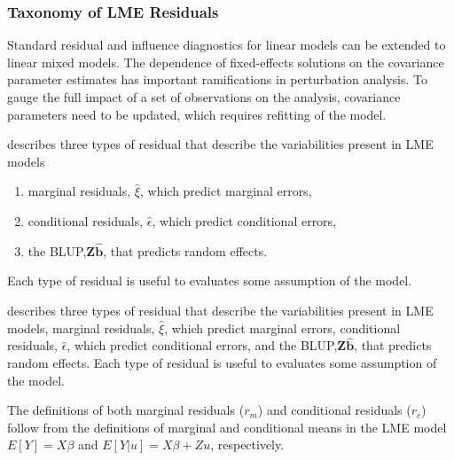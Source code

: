 \documentclass[]{report}
\begin{document}
%

	\subsubsection{Taxonomy of LME Residuals}
	Standard residual and influence diagnostics for linear models can
	be extended to linear mixed models. The dependence of
	fixed-effects solutions on the covariance parameter estimates has
	important ramifications in perturbation analysis. To gauge the
	full impact of a set of observations on the analysis, covariance
	parameters need to be updated, which requires refitting of the
	model.

\citet{PB} describes three types of residual that describe the variabilities
present in LME models
\begin{enumerate}
	\item marginal residuals, $\hat{\xi}$, which predict marginal errors,
	\item conditional residuals, $\hat{\epsilon}$, which predict conditional errors,
	\item the BLUP,$\boldsymbol{Z\hat{b}}$, that predicts random effects.
\end{enumerate}
Each type of residual is useful to evaluates some assumption of the model.
	
\citet{PB} describes three types of residual that describe the variabilities
present in LME models, marginal residuals, $\hat{\xi}$, which predict marginal errors, conditional residuals, $\hat{\epsilon}$, which predict conditional errors, and the BLUP,$\boldsymbol{Z\hat{b}}$, that predicts random effects.
Each type of residual is useful to evaluates some assumption of the model.
	
The definitions of both marginal residuals ($r_m$) and conditional residuals ($r_c$) follow from the definitions of marginal and conditional means in the LME model 
	$E[{Y}] = {X}{\beta}$ and $E[{Y|u}] = {X}{\beta} + {Z}{u}$, respectively.
	
\end{document}

